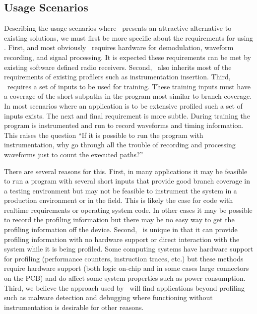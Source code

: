 \subsection{Usage Scenarios}

Describing the usage scenarios where \zop\ presents an attractive alternative to existing solutions, we must first be more specific about the requirements for using \zop. First, and most obviously \zop\ requires hardware for demodulation, waveform recording, and signal processing. It is expected these requirements can be met by existing software defined radio receivers. Second, \zop\ also inherits most of the requirements of existing profilers such as instrumentation insertion. Third, \zop\ requires a set of inputs to be used for training. These training inputs must have a coverage of the short subpaths in the program most similar to branch coverage. In most scenarios where an application is to be extensive profiled such a set of inputs exists. The next and final requirement is more subtle. During training the program is instrumented and run to record waveforms and timing information. This raises the question ``If it is possible to run the program with instrumentation, why go through all the trouble of recording and processing waveforms just to count the executed paths?''

There are several reasons for this. First, in many applications it may be feasible to run a program with several short inputs that provide good branch coverage in a testing environment but may not be feasible to instrument the system in a production environment or in the field. This is likely the case for code with realtime requirements or operating system code. In other cases it may be possible to record the profiling information but there may be no easy way to get the profiling information off the device. Second, \zop\ is unique in that it can provide profiling information with no hardware support or direct interaction with the system while it is being profiled. Some computing systems have hardware support for profiling (performance counters, instruction traces, etc.) but these methods require hardware support (both logic on-chip and in some cases large connectors on the PCB) and do affect some system properties such as power consumption. Third, we believe the approach used by \zop\ will find applications beyond profiling such as malware detection and debugging where functioning without instrumentation is desirable for other reasons.
